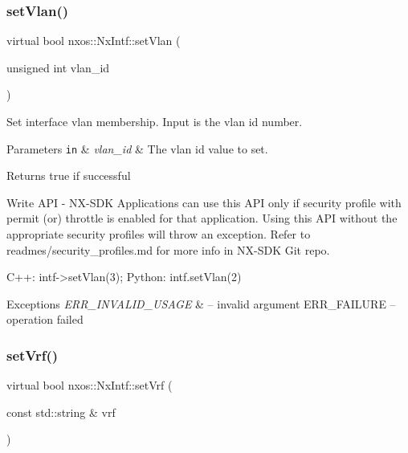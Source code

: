 \subsubsection{\texorpdfstring{set\+Vlan()}{setVlan()}}
{\footnotesize\ttfamily virtual bool nxos\+::\+Nx\+Intf\+::set\+Vlan (\begin{DoxyParamCaption}\item[{unsigned int}]{vlan\+\_\+id }\end{DoxyParamCaption})\hspace{0.3cm}{\ttfamily [pure virtual]}}

Set interface vlan membership. Input is the vlan id number. 
\begin{DoxyParams}[1]{Parameters}
\mbox{\tt in}  & {\em vlan\+\_\+id} & The vlan id value to set. \\
\hline
\end{DoxyParams}
\begin{DoxyReturn}{Returns}
true if successful
\end{DoxyReturn}
\begin{DoxyVerb}Write API - NX-SDK Applications can use this API only if security profile with permit (or) throttle is 
            enabled for that application. Using this API without the appropriate security profiles will
            throw an exception. Refer to readmes/security_profiles.md for more info in NX-SDK Git repo.
\end{DoxyVerb}



\begin{DoxyCode}
C++:
     intf->setVlan(3);
Python:
     intf.setVlan(2)
\end{DoxyCode}



\begin{DoxyExceptions}{Exceptions}
{\em E\+R\+R\+\_\+\+I\+N\+V\+A\+L\+I\+D\+\_\+\+U\+S\+A\+GE} & -- invalid argument E\+R\+R\+\_\+\+F\+A\+I\+L\+U\+RE -- operation failed \\
\hline
\end{DoxyExceptions}
\mbox{\label{classnxos_1_1_nx_intf_a91343eb99de8391f1a0e06646ae13b5e}} 
\subsubsection{\texorpdfstring{set\+Vrf()}{setVrf()}}
{\footnotesize\ttfamily virtual bool nxos\+::\+Nx\+Intf\+::set\+Vrf (\begin{DoxyParamCaption}\item[{const std\+::string \&}]{vrf }\end{DoxyParamCaption})\hspace{0.3cm}{\ttfamily [pure virtual]}}

